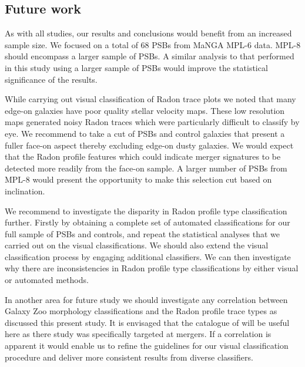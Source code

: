 \subsection{Future work}
\label{sec:future-work}
As with all studies, our results and conclusions would benefit from an increased sample size. We focused on a total of 68 PSBs from MaNGA MPL-6 data. MPL-8 should encompass a larger sample of PSBs. A similar analysis to that performed in this study using a larger sample of PSBs would improve the statistical significance of the results.

While carrying out visual classification of Radon trace plots we noted that many edge-on galaxies have poor quality stellar velocity maps. These low resolution maps generated noisy Radon traces which were particularly difficult to classify by eye. We recommend to take a cut of PSBs and control galaxies that present a fuller face-on aspect thereby excluding edge-on dusty galaxies. We would expect that the Radon profile features which could indicate merger signatures to be detected more readily from the face-on sample. A larger number of PSBs from MPL-8 would present the opportunity to make this selection cut based on inclination.

We recommend to investigate the disparity in Radon profile type classification further. Firstly by obtaining a complete set of automated classifications for our full sample of PSBs and controls, and repeat the statistical analyses that we carried out on the visual classifications. We should also extend the visual classification process by engaging additional classifiers. We can then investigate why there are inconsistencies in Radon profile type classifications by either visual or automated methods. 

In another area for future study we should investigate any correlation between Galaxy Zoo morphology classifications and the Radon profile trace types as discussed this present study. It is envisaged that the catalogue of \citet{2018MNRAS.479..415A} will be useful here as there study was specifically targeted at mergers. If a correlation is apparent it would enable us to refine the guidelines for our visual classification procedure and deliver more consistent results from diverse classifiers.


